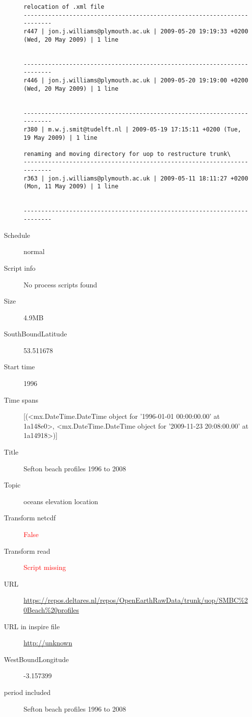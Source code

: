 \documentclass[9]{report}
\begin{document}
\begin{description}
\begin{verbatim}
relocation of .xml file
------------------------------------------------------------------------
r447 | jon.j.williams@plymouth.ac.uk | 2009-05-20 19:19:33 +0200 (Wed, 20 May 2009) | 1 line


------------------------------------------------------------------------
r446 | jon.j.williams@plymouth.ac.uk | 2009-05-20 19:19:00 +0200 (Wed, 20 May 2009) | 1 line


------------------------------------------------------------------------
r380 | m.w.j.smit@tudelft.nl | 2009-05-19 17:15:11 +0200 (Tue, 19 May 2009) | 1 line

renaming and moving directory for uop to restructure trunk\
------------------------------------------------------------------------
r363 | jon.j.williams@plymouth.ac.uk | 2009-05-11 18:11:27 +0200 (Mon, 11 May 2009) | 1 line


------------------------------------------------------------------------

\end{verbatim}
  \item[Schedule] normal
  \item[Script info] No process scripts found
  \item[Size] 4.9MB
  \item[SouthBoundLatitude] 53.511678
  \item[Start time] 1996
  \item[Time spans] [(<mx.DateTime.DateTime object for '1996-01-01 00:00:00.00' at 1a148e0>, <mx.DateTime.DateTime object for '2009-11-23 20:08:00.00' at 1a14918>)]
  \item[Title]  Sefton beach profiles 1996 to 2008 
  \item[Topic] oceans elevation location
  \item[Transform netcdf] \textcolor{red}{False}
  \item[Transform read] \textcolor{red}{Script missing}
  \item[URL] \href{https://repos.deltares.nl/repos/OpenEarthRawData/trunk/uop/SMBC\%20Beach\%20profiles}{https://repos.deltares.nl/repos/OpenEarthRawData/trunk/uop/SMBC\%20Beach\%20profiles}
  \item[URL in inspire file] \href{http://unknown}{http://unknown}
  \item[WestBoundLongitude] -3.157399
  \item[period included] Sefton beach profiles 1996 to 2008
\end{description}
\end{document}
